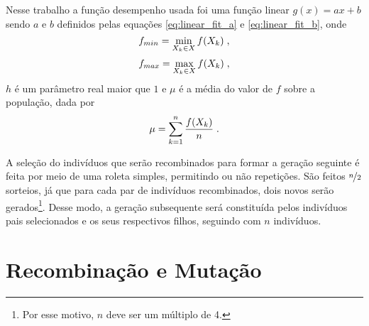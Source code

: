 Nesse trabalho a função desempenho usada foi uma função linear $ g(x) = ax + b $
sendo $a$ e $b$ definidos pelas equações \ref{eq:linear_fit_a} e \ref{eq:linear_fit_b},
onde
\begin{equation}
  f_{min} = \min_{X_k \in X} f(X_k) \;\mathrm{,}
\end{equation}
\begin{equation}
  f_{max} = \max_{X_k \in X} f(X_k) \;\mathrm{,}
\end{equation}
$h$ é um parâmetro real maior que $1$ e $\mu$ é a média do valor de $f$ sobre a população, dada por
\begin{equation}
  \mu = \sum_{k = 1}^n \frac{f(X_k)}{n} \;\mathrm{.}
\end{equation}

A seleção do indivíduos que serão recombinados para formar a geração seguinte é feita por meio
de uma roleta simples, permitindo ou não repetições. São feitos $ \nicefrac{n}{2} $ sorteios,
já que para cada par de indivíduos recombinados, dois novos serão gerados\footnote{
  Por esse motivo, $n$ deve ser um múltiplo de 4.
}.
Desse modo, a geração subsequente será constituída pelos indivíduos pais selecionados e os seus
respectivos filhos, seguindo com $n$ indivíduos.

\section{Recombinação e Mutação}



